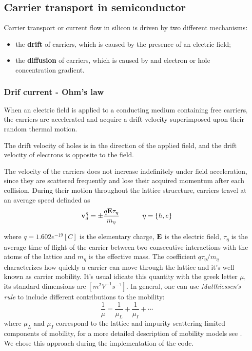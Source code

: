 \subsection{Carrier transport in semiconductor}

Carrier transport or current flow in silicon is driven by two different mechanisms:
\begin{itemize}
\item the \textbf{drift} of carriers, which is caused by the presence of an electric field;
\item the \textbf{diffusion} of carriers, which is caused by and electron or hole concentration gradient.
\end{itemize}

\subsubsection{Drif current - Ohm's law}

When an electric field is applied to a conducting medium containing free carriers, the carriers are accelerated and acquire a drift velocity superimposed upon their random thermal motion.

\begin{Osservazione}
The drift velocity of holes is in the direction of the applied field, and the drift velocity of electrons is opposite to the field.
\end{Osservazione}

The velocity of the carriers does not increase indefinitely under field acceleration, since they are scattered frequently and lose their acquired momentum after each collision.
During their motion throughout the lattice struccture, carriers travel at an average speed definded as
\begin{equation}
\vect{v}_d^\eta = \pm \dfrac{q\vect{E}\tau_\eta}{m_\eta}  \psp{20} \eta=\{h,e\}
\end{equation}

where $q=1.602e^{-19}[C]$ is the elementary charge, $\mathbf{E}$ is the electric field, $\tau_\eta$ is the average time of flight of the carrier between two consecutive interactions with the atoms of the lattice and $m_\eta$ is the effective mass.
The coefficient $q\tau_\eta / m_\eta$ characterizes how quickly a carrier can move through the lattice and it's well known as carrier mobility. It's usual idicate this quantity with the greek letter $\mu$, its standard dimensions are $[m^2V^{-1}s^{-1}]$.
In general, one can use \textit{Matthiessen's rule} to include different contributions to the mobility:
\begin{equation}
\dfrac{1}{\mu} = \dfrac{1}{\mu_L} + \dfrac{1}{\mu_I} + \cdots
\end{equation}
where $\mu_L$ and $\mu_I$ correspond to the lattice and impurity scattering limited components of mobility, for a more detailed description of mobility models see \cite{ModernVLSIdevices}. We chose this approach during the implementation of the code.

